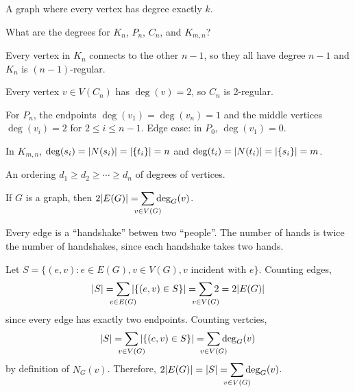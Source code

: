 \begin{defn}[$k$-regularity]
  A graph where every vertex has degree exactly $k$.
\end{defn}

\begin{example}
  What are the degrees for $K_n$, $P_n$, $C_n$, and $K_{m,n}$?
\end{example}
\begin{sol}
  Every vertex in $K_n$ connects to the other $n-1$,
  so they all have degree $n-1$ and $K_n$ is $(n-1)$-regular.

  Every vertex $v \in V(C_n)$ has $\deg(v) = 2$, so $C_n$ is 2-regular.

  For $P_n$, the endpoints $\deg(v_1) = \deg(v_n) = 1$
  and the middle vertices $\deg(v_i) = 2$ for $2 \leq i \leq n-1$.
  Edge case: in $P_0$, $\deg(v_1) = 0$.

  In $K_{m,n}$, $\deg(s_i) = \abs{N(s_i)} = \abs{\{t_i\}} = n$
  and $\deg(t_i) = \abs{N(t_i)} = \abs{\{s_i\}} = m$.
\end{sol}

\begin{defn}
  An ordering $d_1 \geq d_2 \geq \dotsb \geq d_n$ of degrees of vertices.
\end{defn}

\begin{theorem}\label{thm:hand}
  If $G$ is a graph, then $2\abs{E(G)} = \smashoperator{\sum\limits_{v \in V(G)}} \deg_G(v)$.
\end{theorem}
\begin{prf}[Informal]
  Every edge is a ``handshake'' betwen two ``people''.
  The number of hands is twice the number of handshakes,
  since each handshake takes two hands.
\end{prf}
\begin{prf}[Formal]
  Let $S = \{(e,v) : e \in E(G), v \in V(G), \text{$v$ incident with $e$}\}$.
  Counting edges,
  \[
    \abs{S} = \smashoperator{\sum_{e \in E(G)}} \abs{\{(e,v) \in S\}}
    = \smashoperator{\sum_{v \in V(G)}} 2
    = 2 \abs{E(G)}
  \]
  since every edge has exactly two endpoints.
  Counting vertcies,
  \[
    \abs{S} = \smashoperator{\sum_{v \in V(G)}} \abs{\{(e,v) \in S\}}
    = \smashoperator{\sum_{v \in V(G)}} \deg_G(v)
  \]
  by definition of $N_G(v)$.
  Therefore, $2\abs{E(G)} = \abs{S} = \smashoperator{\sum\limits_{v \in V(G)}} \deg_G(v)$.
\end{prf}

